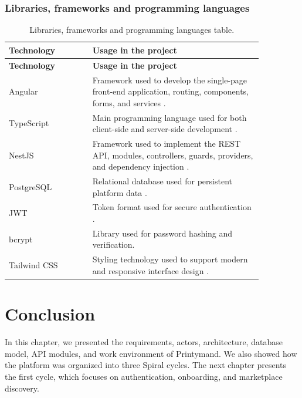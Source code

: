 \subsubsection{Libraries, frameworks and programming languages}
\begin{longtable}{|p{0.28\linewidth}|p{0.58\linewidth}|}
\caption{Libraries, frameworks and programming languages table.} \label{tab:libraries_frameworks} \\
\hline
\textbf{Technology} & \textbf{Usage in the project} \\ \hline
\endfirsthead
\hline
\textbf{Technology} & \textbf{Usage in the project} \\ \hline
\endhead
\hline
\endfoot
Angular & Framework used to develop the single-page front-end application, routing, components, forms, and services \cite{Angular}. \\ \hline
TypeScript & Main programming language used for both client-side and server-side development \cite{TypeScript}. \\ \hline
NestJS & Framework used to implement the REST API, modules, controllers, guards, providers, and dependency injection \cite{NestJS}. \\ \hline
PostgreSQL & Relational database used for persistent platform data \cite{PostgreSQL}. \\ \hline
JWT & Token format used for secure authentication \cite{JWT}. \\ \hline
bcrypt & Library used for password hashing and verification. \\ \hline
Tailwind CSS & Styling technology used to support modern and responsive interface design \cite{Tailwind}. \\ \hline
\end{longtable}

\section{Conclusion}
In this chapter, we presented the requirements, actors, architecture, database model, API modules, and work environment of Printymand.
We also showed how the platform was organized into three Spiral cycles.
The next chapter presents the first cycle, which focuses on authentication, onboarding, and marketplace discovery.
